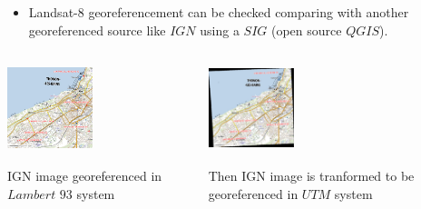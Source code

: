 \documentclass[c]{beamer}
\begin{document}
\begin{frame}
\begin{itemize}
 \item Landsat-8 georeferencement can be checked comparing with another georeferenced source like $IGN$ using a $SIG$ (open source $QGIS$).
\end{itemize}

\begin{columns}[t]
\begin{column}{0.30\textwidth}
\begin{overlayarea}{\linewidth}{3cm}
  \centering\vfill
  \includegraphics[height=2.5cm,width=2.5cm]{images/georeferencing/ign-points-Thonon.png}
\end{overlayarea}
\begin{overlayarea}{\linewidth}{2cm}
  \centering
  \scriptsize IGN image georeferenced in $Lambert$ $93$ system\par
\end{overlayarea}
\end{column}
\begin{column}{0.30\textwidth}
\begin{overlayarea}{\linewidth}{3cm}
  \centering\vfill
  \includegraphics[height=2.5cm,width=2.5cm]{images/georeferencing/qgis-resultat.png}
\end{overlayarea}
\begin{overlayarea}{\linewidth}{2cm}
  \centering
  \scriptsize Then IGN image is tranformed to be georeferenced in $UTM$ system\par
\end{overlayarea}

\end{column}
\end{columns}
\end{frame}
\end{document}
